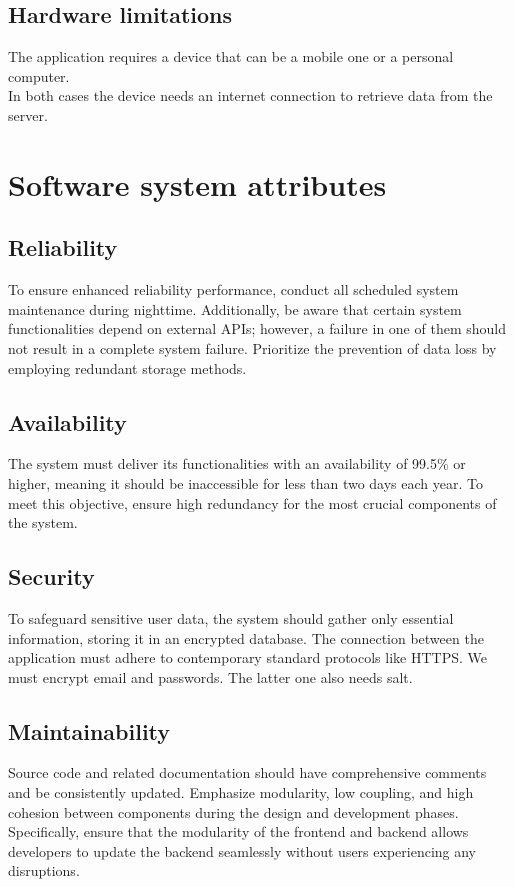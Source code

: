 \documentclass[12pt, a4paper]{report}
\begin{document}
        \subsection{Hardware limitations}
        The application requires a device that can be a mobile one or a personal computer. \\
        In both cases the device needs an internet connection to retrieve data from the server. 

        \section{Software system attributes}
        \subsection{Reliability}
        To ensure enhanced reliability performance, conduct all scheduled system maintenance during nighttime. 
        Additionally, be aware that certain system functionalities depend on external APIs; however, a failure in one of them should not result in a complete system failure. 
        Prioritize the prevention of data loss by employing redundant storage methods.

        \subsection{Availability}
        The system must deliver its functionalities with an availability of 99.5\% or higher, meaning it should be inaccessible for less than two days each year.
        To meet this objective, ensure high redundancy for the most crucial components of the system.

        \subsection{Security}
        To safeguard sensitive user data, the system should gather only essential information, storing it in an encrypted database. 
        The connection between the application must adhere to contemporary standard protocols like HTTPS.
        We must encrypt email and passwords. 
        The latter one also needs salt. 

        \subsection{Maintainability}
        Source code and related documentation should have comprehensive comments and be consistently updated. 
        Emphasize modularity, low coupling, and high cohesion between components during the design and development phases. 
        Specifically, ensure that the modularity of the frontend and backend allows developers to update the backend seamlessly without users experiencing any disruptions.
\end{document}
